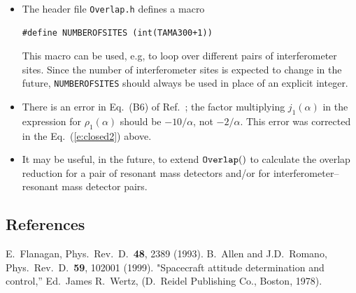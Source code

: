 \documentclass{article}
\begin{document}
\begin{itemize}
%
\item
The header file {\tt Overlap.h\/} defines a macro
%
\begin{verbatim}
#define NUMBEROFSITES (int(TAMA300+1))
\end{verbatim}
%
This macro can be used, e.g, to loop over different pairs of 
interferometer sites.
Since the number of interferometer sites is expected to change in the 
future, {\tt NUMBEROFSITES\/} should always be used in place of an 
explicit integer.
\item
There is an error in Eq.~(B6) of Ref.~\cite{flanagan}; 
the factor multiplying $j_1(\alpha)$ in the expression for 
$\rho_1(\alpha)$ should be $-10/\alpha$, not $-2/\alpha$.
This error was corrected in the Eq.~(\ref{e:closed2}) above.
\item
It may be useful, in the future, to extend ${\tt Overlap()\/}$ to 
calculate the overlap reduction for a pair of resonant mass
detectors and/or for interferometer--resonant mass detector pairs.
%
\end{itemize}

\subsection{References}

\begin{thebibliography}{0}
E.~Flanagan, 
Phys.\ Rev.\ D.\ {\bf 48}, 2389 (1993).
B.~Allen and J.D.~Romano, 
Phys.\ Rev.\ D.\ {\bf 59}, 102001 (1999).
"Spacecraft attitude determination and control,''  
Ed.\ James R.\ Wertz, 
(D.\ Reidel Publishing Co., Boston, 1978).
\end{thebibliography}
\end{document}
